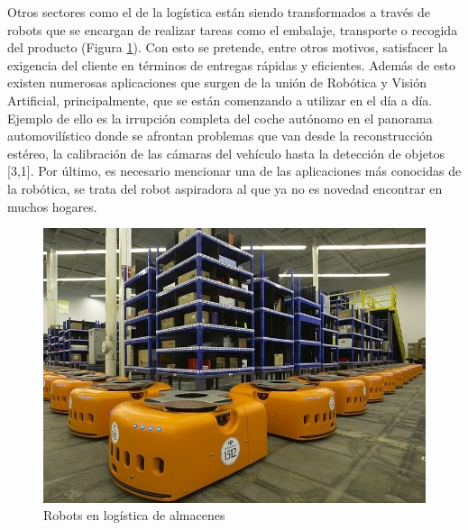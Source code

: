 \documentclass{bmvc2k}
\begin{document}
\noindent Otros sectores como el de la logística están siendo transformados a través de robots que se encargan de realizar tareas como el embalaje, transporte o recogida del producto (Figura \ref{fig:logistica}). Con esto se pretende, entre otros motivos, satisfacer la exigencia del cliente en términos de entregas rápidas y eficientes. Además de esto existen numerosas aplicaciones que surgen de la unión de Robótica y Visión Artificial, principalmente, que se están comenzando a utilizar en el día a día. Ejemplo de ello es la irrupción completa del coche autónomo en el panorama automovilístico donde se afrontan problemas que van desde la reconstrucción estéreo, la calibración de las cámaras del vehículo hasta la detección de objetos [3,1]. Por último, es necesario mencionar una de las aplicaciones más conocidas de la robótica, se trata del robot aspiradora al que ya no es novedad encontrar en muchos hogares.
\begin{figure}[h!]
\begin{center}
\includegraphics[scale=0.2]{amazonlogistics.jpg}
\caption{Robots en logística de almacenes}
\label{fig:logistica}
\end{center}
\end{figure}
\end{document}
